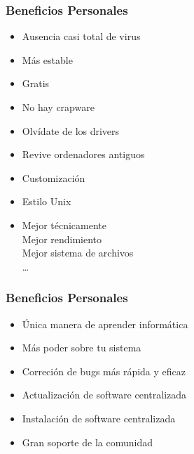 \documentclass{beamer}
\begin{document}
\begin{frame}\frametitle{Beneficios Personales}
    \begin{itemize}
        \item Ausencia casi total de virus
        \item Más estable
        \item Gratis
        \item No hay crapware
        \item Olvídate de los drivers
        \item Revive ordenadores antiguos
        \item Customización
        \item Estilo Unix
        \item Mejor técnicamente \\
            Mejor rendimiento \\ 
            Mejor sistema de archivos \\
            \ldots 
    \end{itemize}
\end{frame}

\begin{frame}\frametitle{Beneficios Personales}
    \begin{itemize}
        \item Única manera de aprender informática 
        \item Más poder sobre tu sistema
        \item Correción de bugs más rápida y eficaz
        \item Actualización de software centralizada
        \item Instalación de software centralizada
        \item Gran soporte de la comunidad
    \end{itemize}
\end{frame}
\end{document}
